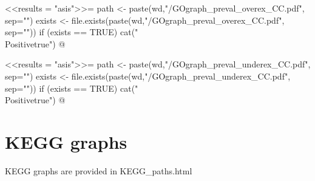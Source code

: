 \documentclass{article}
\begin{document}
\newif\ifPositive

<<results = "asis">>=
path <- paste(wd,"/GOgraph_preval_overex_CC.pdf", sep="")
exists <- file.exists(paste(wd,"/GOgraph_preval_overex_CC.pdf", sep=""))
if (exists == TRUE) {
  cat("\\Positivetrue")
}
@

\ifPositive
  \subsection{GOgraphs showing overexpressed functions from prevalent DEGs}
  This is the GO graph concerning the overexpressed prevalent DEGs (Image extracted from {\bf"GOgraph\_preval\_overex\_CC.pdf"} file):
  \begin{center}
    \texttt{[image: \\Sexpr\{path]}}
  \end{center}
\fi


\newif\ifPositive

<<results = "asis">>=
path <- paste(wd,"/GOgraph_preval_underex_CC.pdf", sep="")
exists <- file.exists(paste(wd,"/GOgraph_preval_underex_CC.pdf", sep=""))
if (exists == TRUE) {
  cat("\\Positivetrue")
}
@

\ifPositive
  \subsection{GOgraphs showing underexpressed functions from prevalent DEGs}
  This is the GO graph concerning the underexpressed prevalent DEGs (Image extracted from {\bf"GOgraph\_preval\_underex\_CC.pdf"} file):
  \begin{center}
    \texttt{[image: \\Sexpr\{path]}}
  \end{center}
\fi


\section{KEGG graphs}

KEGG graphs are provided in KEGG\_paths.html 
\end{document}
